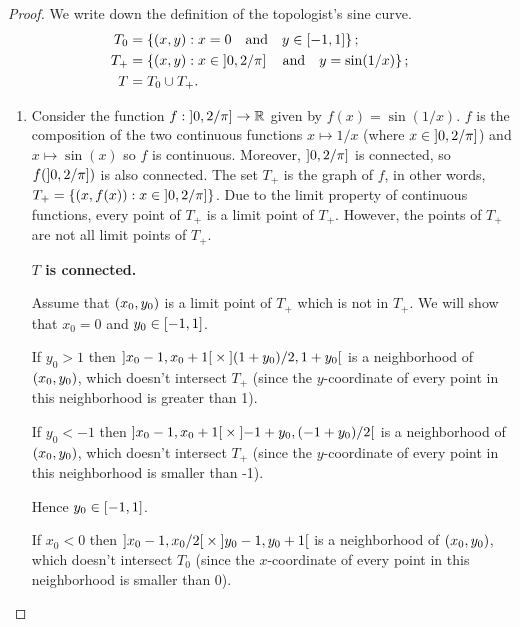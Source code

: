 \begin{proof}
	We write down the definition of the topologist's sine curve.
	\begin{align*}
		T_{0} & = \left\{{\left({x,y}\right) : x = 0 \quad\text{and}\quad y \in \left[{-1,1}\right]}\right\};           \\
		T_{+} & = \left\{{\left({x,y}\right) : x \in \left]{0, 2/\pi}\right] \quad\text{and}\quad y = \sin(1/x)}\right\}; \\
		T     & = T_{0} \cup T_{+}.
	\end{align*}
	\begin{enumerate}[label={(\alph*)}]
		\item Consider the function $f: \left]{0, 2/\pi}\right] \to \mathbb{R}$ given by $f(x) = \sin(1/x)$. $f$ is the composition of the two continuous functions $x\mapsto 1/x$ (where $x\in \left]{0, 2/\pi}\right]$) and $x\mapsto \sin(x)$ so $f$ is continuous. Moreover, $\left]{0, 2/\pi}\right]$ is connected, so $f(\left]{0, 2/\pi}\right])$ is also connected. The set $T_{+}$ is the graph of $f$, in other words, $T_{+} = \left\{{ (x, f(x)) : x\in\left]{0,2/\pi}\right] }\right\}$. Due to the limit property of continuous functions, every point of $T_{+}$ is a limit point of $T_{+}$. However, the points of $T_{+}$ are not all limit points of $T_{+}$.

		      \textbf{$T$ is connected.}

		      Assume that $\left({x_{0}, y_{0}}\right)$ is a limit point of $T_{+}$ which is not in $T_{+}$. We will show that $x_{0} = 0$ and $y_{0} \in \left[{-1,1}\right]$.

		      If $y_{0} > 1$ then $\left]{x_{0} - 1, x_{0} + 1}\right[ \times \left]{(1 + y_{0})/2, 1 + y_{0}}\right[$ is a neighborhood of $\left({x_{0}, y_{0}}\right)$, which doesn't intersect $T_{+}$ (since the $y$-coordinate of every point in this neighborhood is greater than 1).

		      If $y_{0} < -1$ then $\left]{x_{0} - 1, x_{0} + 1}\right[ \times \left]{-1 + y_{0}, (-1 + y_{0})/2}\right[$ is a neighborhood of $\left({x_{0}, y_{0}}\right)$, which doesn't intersect $T_{+}$ (since the $y$-coordinate of every point in this neighborhood is smaller than -1).

		      Hence $y_{0} \in \left[{-1,1}\right]$.

		      If $x_{0} < 0$ then $\left]{x_{0} - 1, x_{0}/2}\right[ \times \left]{y_{0} - 1, y_{0} + 1}\right[$ is a neighborhood of $\left({x_{0}, y_{0}}\right)$, which doesn't intersect $T_{0}$ (since the $x$-coordinate of every point in this neighborhood is smaller than 0).


\end{enumerate}
\end{proof}
